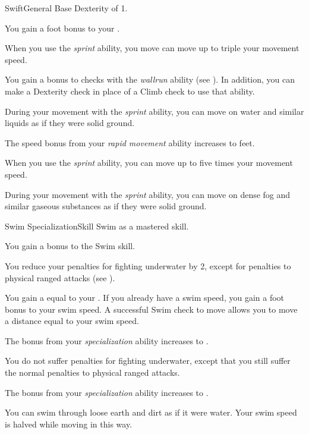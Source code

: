     \begin{feat}{Swift}{General}
        \featpre Base Dexterity of 1.

         You gain a  foot bonus to your .

         When you use the \textit{sprint} ability, you move can move up to triple your movement speed.

         You gain a  bonus to checks with the \textit{wallrun} ability (see ).
        In addition, you can make a Dexterity check in place of a Climb check to use that ability.

         During your movement with the \textit{sprint} ability, you can move on water and similar liquids as if they were solid ground.

         The speed bonus from your \textit{rapid movement} ability increases to  feet.

         When you use the \textit{sprint} ability, you can move up to five times your movement speed.

         During your movement with the \textit{sprint} ability, you can move on dense fog and similar gaseous substances as if they were solid ground.
    \end{feat}

    \begin{feat}{Swim Specialization}{Skill}
        \featpre Swim as a mastered skill.

         You gain a  bonus to the Swim skill.

         You reduce your penalties for fighting underwater by 2, except for penalties to physical ranged attacks (see ).

         You gain a  equal to your .
        If you already have a swim speed, you gain a  foot bonus to your swim speed.
        A successful Swim check to move allows you to move a distance equal to your swim speed.

         The bonus from your \textit{specialization} ability increases to .

         You do not suffer penalties for fighting underwater, except that you still suffer the normal penalties to physical ranged attacks.

         The bonus from your \textit{specialization} ability increases to .

         You can swim through loose earth and dirt as if it were water.
        Your swim speed is halved while moving in this way.
    \end{feat}

